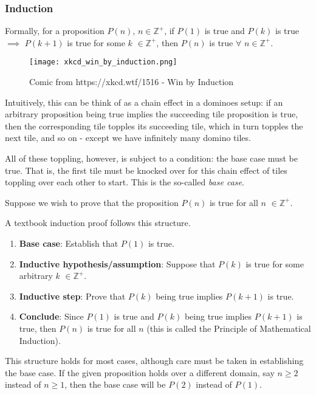 \documentclass[../jarvis.tex]{subfiles}
\begin{document}
\subsubsection{Induction}
Formally, for a proposition $P(n)$, $n\in\mathbb{Z}^+$, if $P(1)$ is true and $P(k)$ is true $\implies$ $P(k+1)$ is true for some $k$ $\in\mathbb{Z}^+$, then $P(n)$ is true $\forall$ $n\in\mathbb{Z}^+$.
\begin{figure}[H]
    \centering
    \texttt{[image: xkcd\_win\_by\_induction.png]}
    \caption{Comic from https://xkcd.wtf/1516 - Win by Induction}
\end{figure}
Intuitively, this can be think of as a chain effect in a dominoes setup: if an arbitrary proposition being true implies the succeeding tile proposition is true, then the corresponding tile topples its succeeding tile, which in turn topples the next tile, and so on - except we have infinitely many domino tiles.

All of these toppling, however, is subject to a condition: the base case must be true. That is, the first tile must be knocked over for this chain effect of tiles toppling over each other to start. This is the so-called \textit{base case}.

Suppose we wish to prove that the proposition $P(n)$ is true for all $n$ $\in\mathbb{Z}^+$. 
\begin{proposition}
    A textbook induction proof follows this structure.
\begin{enumerate}
    \item \textbf{Base case}: Establish that $P(1)$ is true.
    \item \textbf{Inductive hypothesis/assumption}: Suppose that $P(k)$ is true for some arbitrary $k$ $\in\mathbb{Z}^+$. 
    \item \textbf{Inductive step}: Prove that $P(k)$ being true implies $P(k+1)$ is true. 
    \item \textbf{Conclude}: Since $P(1)$ is true and $P(k)$ being true implies $P(k+1)$ is true, then $P(n)$ is true for all $n$ (this is called the Principle of Mathematical Induction).
\end{enumerate}
\end{proposition}
This structure holds for most cases, although care must be taken in establishing the base case. If the given proposition holds over a different domain, say $n\geq 2$ instead of $n\geq 1$, then the base case will be $P(2)$ instead of $P(1)$.
\end{document}
